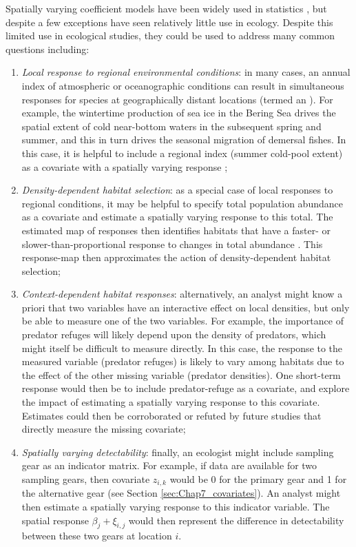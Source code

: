 Spatially varying coefficient models have been widely used in statistics \cite{gelfand_spatial_2003,hastie_varying-coefficient_1993}, but despite a few exceptions \cite{finley_comparing_2011,thorson_measuring_2019} have seen relatively little use in ecology. Despite this limited use in ecological studies, they could be used to address many common questions including:
\begin{enumerate}
    \item \textit{Local response to regional environmental conditions}: in many cases, an annual index of atmospheric or oceanographic conditions can result in simultaneous responses for species at geographically distant locations (termed an ).  For example, the wintertime production of sea ice in the Bering Sea drives the spatial extent of cold near-bottom waters in the subsequent spring and summer, and this in turn drives the seasonal migration of demersal fishes.  In this case, it is helpful to include a regional index (summer cold-pool extent) as a covariate with a spatially varying response \cite{thorson_measuring_2019};
    
    \item \textit{Density-dependent habitat selection}:  as a special case of local responses to regional conditions, it may be helpful to specify total population abundance as a covariate and estimate a spatially varying response to this total.  The estimated map of responses then identifies habitats that have a faster- or slower-than-proportional response to changes in total abundance \cite{thorson_development_2022}.  This response-map then approximates the action of density-dependent habitat selection;  
    
    \item \textit{Context-dependent habitat responses}:  alternatively, an analyst might know a priori that two variables have an interactive effect on local densities, but only be able to measure one of the two variables. For example, the importance of predator refuges will likely depend upon the density of predators, which might itself be difficult to measure directly. In this case, the response to the measured variable (predator refuges) is likely to vary among habitats due to the effect of the other missing variable (predator densities).  One short-term response would then be to include predator-refuge as a covariate, and explore the impact of estimating a spatially varying response to this covariate.  Estimates could then be corroborated or refuted by future studies that directly measure the missing covariate;   
    
    \item \textit{Spatially varying detectability}: finally, an ecologist might include sampling gear as an indicator matrix.  For example, if data are available for two sampling gears, then covariate \( z_{i,k} \) would be 0 for the primary gear and 1 for the alternative gear (see Section \ref{sec:Chap7_covariates}).  An analyst might then estimate a spatially varying response to this indicator variable. The spatial response \( \beta_j + \xi_{i,j} \) would then represent the difference in detectability between these two gears at location \(i\).    

\end{enumerate}
